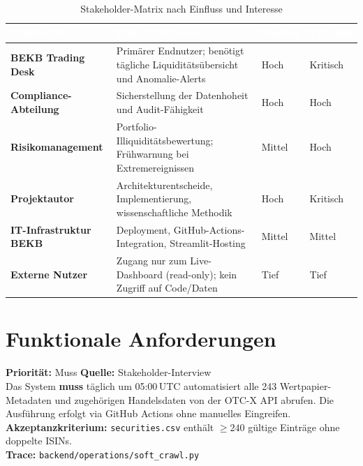 \documentclass[12pt, a4paper, oneside]{report}
\newcommand{\code}[1]{\texttt{\small\textcolor{darknavy}{#1}}}
\begin{document}
\begin{table}[H]
\centering
\caption{Stakeholder-Matrix nach Einfluss und Interesse}
\label{tab:stakeholders}
\begin{tabularx}{\textwidth}{>{\bfseries\sffamily}l X l l}
  \toprule
  \rowcolor{darknavy} \textcolor{white}{Stakeholder} & \textcolor{white}{Rolle \& Interesse} & \textcolor{white}{Einfluss} & \textcolor{white}{Priorit\"at} \\
  \midrule
  BEKB Trading Desk     & Prim\"arer Endnutzer; ben\"otigt t\"agliche Liquidit\"ats\"ubersicht und Anomalie-Alerts & Hoch  & Kritisch \\
  Compliance-Abteilung  & Sicherstellung der Datenhoheit und Audit-F\"ahigkeit & Hoch  & Hoch \\
  Risikomanagement      & Portfolio-Illiquidit\"atsbewertung; Fr\"uhwarnung bei Extremereignissen & Mittel & Hoch \\
  Projektautor          & Architekturentscheide, Implementierung, wissenschaftliche Methodik & Hoch  & Kritisch \\
  IT-Infrastruktur BEKB & Deployment, GitHub-Actions-Integration, Streamlit-Hosting & Mittel & Mittel \\
  Externe Nutzer        & Zugang nur zum Live-Dashboard (read-only); kein Zugriff auf Code/Daten & Tief  & Tief \\
  \bottomrule
\end{tabularx}
\end{table}

\section{Funktionale Anforderungen}

\begin{reqbox}
\textbf{Priorit\"at:} Muss \quad \textbf{Quelle:} Stakeholder-Interview \\
Das System \textbf{muss} t\"aglich um 05:00\,UTC automatisiert alle 243 Wertpapier-Metadaten und zugeh\"origen Handelsdaten von der OTC-X API abrufen. Die Ausf\"uhrung erfolgt via GitHub Actions ohne manuelles Eingreifen.\\[4pt]
\textbf{Akzeptanzkriterium:} \code{securities.csv} enth\"alt $\geq 240$ g\"ultige Eintr\"age ohne doppelte ISINs.\\[4pt]
\textbf{Trace:} \code{backend/operations/soft\_crawl.py}
\end{reqbox}
\end{document}

